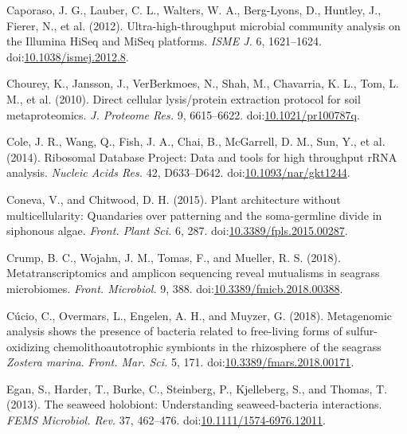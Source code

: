 \documentclass[12pt,]{article}
\begin{document}
\leavevmode\hypertarget{ref-Caporaso2012}{}%
Caporaso, J. G., Lauber, C. L., Walters, W. A., Berg-Lyons, D., Huntley,
J., Fierer, N., et al. (2012). Ultra-high-throughput microbial community
analysis on the Illumina HiSeq and MiSeq platforms. \emph{ISME J.} 6,
1621--1624.
doi:\href{https://doi.org/10.1038/ismej.2012.8}{10.1038/ismej.2012.8}.

\leavevmode\hypertarget{ref-Chourey2010}{}%
Chourey, K., Jansson, J., VerBerkmoes, N., Shah, M., Chavarria, K. L.,
Tom, L. M., et al. (2010). Direct cellular lysis/protein extraction
protocol for soil metaproteomics. \emph{J. Proteome Res.} 9, 6615--6622.
doi:\href{https://doi.org/10.1021/pr100787q}{10.1021/pr100787q}.

\leavevmode\hypertarget{ref-Cole2014}{}%
Cole, J. R., Wang, Q., Fish, J. A., Chai, B., McGarrell, D. M., Sun, Y.,
et al. (2014). Ribosomal Database Project: Data and tools for high
throughput rRNA analysis. \emph{Nucleic Acids Res.} 42, D633--D642.
doi:\href{https://doi.org/10.1093/nar/gkt1244}{10.1093/nar/gkt1244}.

\leavevmode\hypertarget{ref-Coneva2015}{}%
Coneva, V., and Chitwood, D. H. (2015). Plant architecture without
multicellularity: Quandaries over patterning and the soma-germline
divide in siphonous algae. \emph{Front. Plant Sci.} 6, 287.
doi:\href{https://doi.org/10.3389/fpls.2015.00287}{10.3389/fpls.2015.00287}.

\leavevmode\hypertarget{ref-Crump2018}{}%
Crump, B. C., Wojahn, J. M., Tomas, F., and Mueller, R. S. (2018).
Metatranscriptomics and amplicon sequencing reveal mutualisms in
seagrass microbiomes. \emph{Front. Microbiol.} 9, 388.
doi:\href{https://doi.org/10.3389/fmicb.2018.00388}{10.3389/fmicb.2018.00388}.

\leavevmode\hypertarget{ref-Cucio2018}{}%
Cúcio, C., Overmars, L., Engelen, A. H., and Muyzer, G. (2018).
Metagenomic analysis shows the presence of bacteria related to
free-living forms of sulfur-oxidizing chemolithoautotrophic symbionts in
the rhizosphere of the seagrass \emph{Zostera marina}. \emph{Front. Mar.
Sci.} 5, 171.
doi:\href{https://doi.org/10.3389/fmars.2018.00171}{10.3389/fmars.2018.00171}.

\leavevmode\hypertarget{ref-Egan2013}{}%
Egan, S., Harder, T., Burke, C., Steinberg, P., Kjelleberg, S., and
Thomas, T. (2013). The seaweed holobiont: Understanding seaweed-bacteria
interactions. \emph{FEMS Microbiol. Rev.} 37, 462--476.
doi:\href{https://doi.org/10.1111/1574-6976.12011}{10.1111/1574-6976.12011}.
\end{document}

